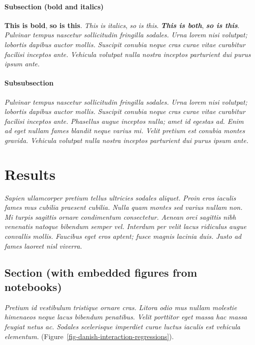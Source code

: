 \documentclass[
  a4paper,
]{scrbook}
\begin{document}
\subsubsection{Subsection (bold and
italics)}\label{subsection-bold-and-italics}

\textbf{This is bold}, \textbf{so is this}. \emph{This is italics},
\emph{so is this}. \textbf{\emph{This is both}}, \textbf{\emph{so is
this}}. \emph{Pulvinar tempus nascetur sollicitudin fringilla sodales.
Urna lorem nisi volutpat; lobortis dapibus auctor mollis. Suscipit
conubia neque cras curae vitae curabitur facilisi inceptos ante.
Vehicula volutpat nulla nostra inceptos parturient dui purus ipsum
ante.}

\subsubsection{Subsubsection}\label{subsubsection}

\emph{Pulvinar tempus nascetur sollicitudin fringilla sodales. Urna
lorem nisi volutpat; lobortis dapibus auctor mollis. Suscipit conubia
neque cras curae vitae curabitur facilisi inceptos ante. Phasellus augue
inceptos nulla; amet id egestas ad. Enim ad eget nullam fames blandit
neque varius mi. Velit pretium est conubia montes gravida. Vehicula
volutpat nulla nostra inceptos parturient dui purus ipsum ante.}

\chapter{Results}\label{results}

\emph{Sapien ullamcorper pretium tellus ultricies sodales aliquet. Proin
eros iaculis fames mus cubilia praesent cubilia. Nulla quam montes sed
varius nullam non. Mi turpis sagittis ornare condimentum consectetur.
Aenean orci sagittis nibh venenatis natoque bibendum semper vel.
Interdum per velit lacus ridiculus augue convallis mollis. Faucibus eget
eros aptent; fusce magnis lacinia duis. Justo ad fames laoreet nisl
viverra.}

\section{Section (with embedded figures from
notebooks)}\label{section-with-embedded-figures-from-notebooks}

\emph{Pretium id vestibulum tristique ornare cras. Litora odio mus
nullam molestie himenaeos neque lacus bibendum penatibus. Velit
porttitor eget massa hac massa feugiat netus ac. Sodales scelerisque
imperdiet curae luctus iaculis est vehicula elementum.}
(Figure~\ref{fig-danish-interaction-regressions}).
\end{document}
